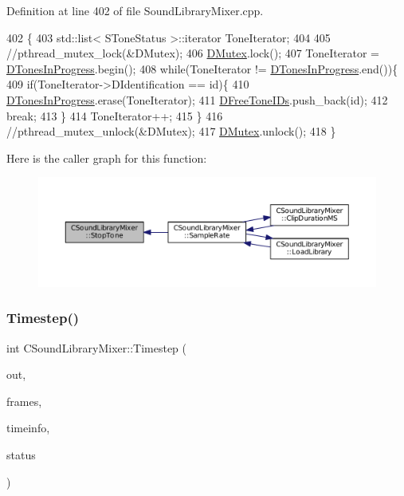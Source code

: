Definition at line 402 of file Sound\+Library\+Mixer.\+cpp.


\begin{DoxyCode}
402                                        \{
403     std::list< SToneStatus >::iterator ToneIterator;
404     
405     \textcolor{comment}{//pthread\_mutex\_lock(&DMutex);}
406     \hyperlink{classCSoundLibraryMixer_a955562a0638df831413a1c6b8860f9fb}{DMutex}.lock();
407     ToneIterator = \hyperlink{classCSoundLibraryMixer_a39bb9c811d842a282b6b7058ac7dfe1c}{DTonesInProgress}.begin();
408     \textcolor{keywordflow}{while}(ToneIterator != \hyperlink{classCSoundLibraryMixer_a39bb9c811d842a282b6b7058ac7dfe1c}{DTonesInProgress}.end())\{
409         \textcolor{keywordflow}{if}(ToneIterator->DIdentification == \textcolor{keywordtype}{id})\{
410             \hyperlink{classCSoundLibraryMixer_a39bb9c811d842a282b6b7058ac7dfe1c}{DTonesInProgress}.erase(ToneIterator);
411             \hyperlink{classCSoundLibraryMixer_a2d1389368651db10fd6fd8b3cd08c164}{DFreeToneIDs}.push\_back(\textcolor{keywordtype}{id});
412             \textcolor{keywordflow}{break};
413         \}
414         ToneIterator++;
415     \}
416     \textcolor{comment}{//pthread\_mutex\_unlock(&DMutex);  }
417     \hyperlink{classCSoundLibraryMixer_a955562a0638df831413a1c6b8860f9fb}{DMutex}.unlock();
418 \}
\end{DoxyCode}
Here is the caller graph for this function\+:
\nopagebreak
\begin{figure}[H]
\begin{center}
\leavevmode
\includegraphics[width=350pt]{classCSoundLibraryMixer_ab57bc3217de14130ed95c48223351ce3_icgraph}
\end{center}
\end{figure}
\hypertarget{classCSoundLibraryMixer_ad3ef0b67b77862e8c88949c3415095e7}{}\label{classCSoundLibraryMixer_ad3ef0b67b77862e8c88949c3415095e7} 
\subsubsection{\texorpdfstring{Timestep()}{Timestep()}}
{\footnotesize\ttfamily int C\+Sound\+Library\+Mixer\+::\+Timestep (\begin{DoxyParamCaption}\item[{void $\ast$}]{out,  }\item[{unsigned long}]{frames,  }\item[{const Pa\+Stream\+Callback\+Time\+Info $\ast$}]{timeinfo,  }\item[{Pa\+Stream\+Callback\+Flags}]{status }\end{DoxyParamCaption})}



